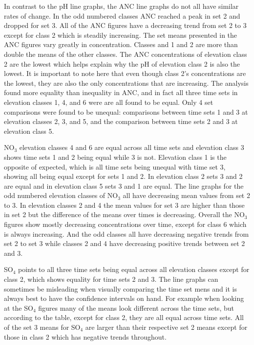 In contrast to the pH line graphs, the ANC line graphs do not all have similar rates of change.
In the odd numbered classes ANC reached a peak in set 2 and dropped for set 3.
All of the ANC figures have a decreasing trend from set 2 to 3 except for class 2 which is steadily increasing. 
The set means presented in the ANC figures vary greatly in concentration.
Classes and 1 and 2 are more than double the means of the other classes.
The ANC concentrations of elevation class 2 are the lowest which helps explain why the pH of elevation class 2 is also the lowest.
It is important to note here that even though class 2's concentrations are the lowest, they are also the only concentrations that are increasing.
The analysis found more equality than inequality in ANC, and in fact all three time sets in elevation classes 1, 4, and 6 were are all found to be equal.  
Only 4 set comparisons were found to be unequal: comparisons between time sets 1 and 3 at elevation classes 2, 3, and 5, and the comparison between time sets 2 and 3 at elevation class 5.

NO$_3$ elevation classes 4 and 6 are equal across all time sets and elevation class 3 shows time sets 1 and 2 being equal while 3 is not.  
Elevation class 1 is the opposite of expected, which is all time sets being unequal with time set 3, showing all being equal except for sets 1 and 2.  
In elevation class 2 sets 3 and 2 are equal and in elevation class 5 sets 3 and 1 are equal.
The line graphs for the odd numbered elevation classes of NO$_3$ all have decreasing mean values from set 2 to 3.
In elevation classes 2 and 4 the mean values for set 3 are higher than those in set 2 but the difference of the means over times is decreasing.
Overall the NO$_3$ figures show mostly decreasing concentrations over time, except for class 6 which is always increasing.
And the odd classes all have decreasing negative trends from set 2 to set 3 while classes 2 and 4 have decreasing positive trends between set 2 and 3.

SO$_4$ points to all three time sets being equal across all elevation classes except for class 2, which shows equality for time sets 2 and 3.  
The line graphs can sometimes be misleading when visually comparing the time set mens and it is always best to have the confidence intervals on hand.
For example when looking at the SO$_4$ figures many of the means look different across the time sets, but according to the table, except for class 2, they are all equal across time sets.
All of the set 3 means for SO$_4$ are larger than their respective set 2 means except for those in class 2 which has negative trends throughout.

